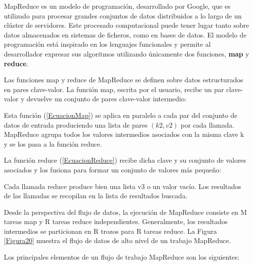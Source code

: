 \documentclass[runningheads]{llncs}
\begin{document}
MapReduce \cite{Dea08} es un modelo de programación, desarrollado por Google, que es utilizado para procesar grandes conjuntos de 
datos distribuidos a lo largo de un clúster de servidores. Este procesado computacional puede tener lugar tanto sobre datos
almacenados en sistemas de ficheros, como en bases de datos. El modelo de programación está inspirado en los lenguajes funcionales 
y permite al desarrollador expresar sus algoritmos utilizando únicamente dos funciones, \textbf{map} y \textbf{reduce}. 

Las funciones map y reduce de MapReduce se definen sobre datos estructurados en pares clave-valor. La función map, escrita por el 
usuario, recibe un par clave-valor y devuelve un conjunto de pares clave-valor intermedio:



Esta función (\ref{EcuacionMap})  se aplica en paralelo a cada par del conjunto de datos de entrada produciendo una lista de 
pares $(k2, v2)$ por cada llamada. MapReduce agrupa todos los valores intermedios asociados con la misma clave k y se los 
pasa a la función reduce.

La función reduce (\ref{EcuacionReduce}) recibe dicha clave y su conjunto de valores asociados y los fusiona para formar un conjunto 
de valores más pequeño:




Cada llamada reduce produce bien una lista v3 o un valor vacío. Los resultados de las llamadas se recopilan en la lista de 
resultados buscada. 




Desde la perspectiva del flujo de datos, la ejecución de MapReduce consiste en M tareas map y R tareas reduce independientes. 
Generalmente, los resultados intermedios se particionan en R trozos para R tareas reduce. La Figura \ref{Figura20} muestra el 
flujo de datos de alto nivel de un trabajo MapReduce.



Los principales elementos de un flujo de trabajo MapReduce son los siguientes:
\end{document}

